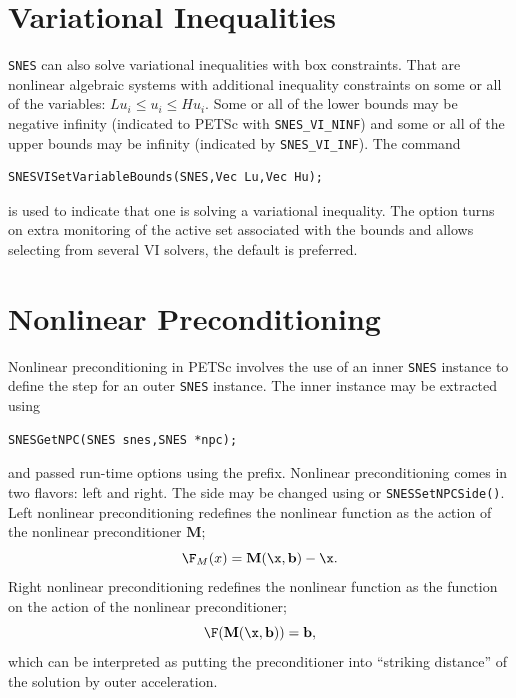 \section{Variational Inequalities}
\label{sec_vi}

\lstinline{SNES} can also solve variational inequalities with box constraints. 
That are nonlinear algebraic systems with additional inequality constraints on some or all of the variables: $ Lu_i \le u_i \le Hu_i $.
Some or all of the lower bounds may be negative infinity (indicated to PETSc with \lstinline{SNES_VI_NINF}) and some or all of the upper bounds may be infinity (indicated by \lstinline{SNES_VI_INF}). The command
\begin{lstlisting}
SNESVISetVariableBounds(SNES,Vec Lu,Vec Hu);
\end{lstlisting}
is  used to indicate that one is solving a variational inequality. The option   turns on extra monitoring of the active set associated with the bounds and   allows selecting from several VI solvers, the default is preferred.

\section{Nonlinear Preconditioning}

Nonlinear preconditioning in PETSc involves the use of an inner \lstinline{SNES} instance to define the step for an outer \lstinline{SNES}
instance.  The inner instance may be extracted using
\begin{lstlisting}
SNESGetNPC(SNES snes,SNES *npc);
\end{lstlisting}
and passed run-time options using the 
prefix. Nonlinear preconditioning comes in two flavors: left and right.  The side may be changed
using  or \lstinline{SNESSetNPCSide()}. Left nonlinear preconditioning redefines the nonlinear function as the action of the
nonlinear preconditioner $\mathbf{M}$;
\begin{equation}
        \F_{M}(x) = \mathbf{M}(\x,\mathbf{b}) - \x.
\end{equation}
\noindent Right nonlinear preconditioning redefines the nonlinear function as the function on the action of the
nonlinear preconditioner;
\begin{equation}
        \F(\mathbf{M}(\x,\mathbf{b})) = \mathbf{b},
\end{equation}
\noindent  which can be interpreted as putting the preconditioner into ``striking distance'' of the solution by outer acceleration.

